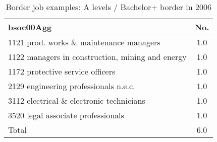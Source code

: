 \begin{table}[h!]
	\centering
	\caption{Border job examples: A levels / Bachelor+ border in 2006}
	\begin{tabular}{lc}
	\toprule
bsoc00Agg&No. \\
\hline
1121 prod. works \& maintenance managers&1.0 \\
1122 managers in construction, mining and energy&1.0 \\
1172 protective service officers&1.0 \\
2129 engineering professionals n.e.c.&1.0 \\
3112 electrical \& electronic technicians&1.0 \\
3520 legal associate professionals&1.0 \\
Total&6.0 \\
\bottomrule
\bottomrule
\end{tabular}
\end{table}
